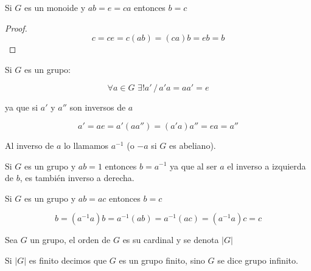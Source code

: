 \begin{prop}
Si $G$ es un monoide y $ab = e = ca$ entonces $b = c$
\end{prop}

\begin{proof}
$$c = ce = c(ab) = (ca)b = eb = b$$
\end{proof}

\begin{cor}
Si $G$ es un grupo:

$$\forall a \in G \,\, \exists ! a' \,/\, a'a = aa' = e$$

\noindent ya que si $a'$ y $a''$ son inversos de $a$

$$a' = ae = a'(aa'') = (a'a)a'' = ea = a''$$
\end{cor}

Al inverso de $a$ lo llamamos $a^{-1}$ (o $-a$ si $G$ es abeliano).

\begin{obs}
Si $G$ es un grupo y $ab = 1$ entonces $b = a^{-1}$ ya que al ser $a$ el inverso a izquierda de $b$, es tambi\'en inverso a derecha.
\end{obs}

\begin{obs}
Si $G$ es un grupo y $ab = ac$ entonces $b = c$

$$b = (a^{-1}a)b = a^{-1}(ab) = a^{-1}(ac) = (a^{-1}a)c = c$$
\end{obs}

\begin{defn}
Sea $G$ un grupo, el orden de $G$ es su cardinal y se denota $|G|$
\end{defn}

Si $|G|$ es finito decimos que $G$ es un grupo finito, sino $G$ se dice grupo infinito.

\bigskip


